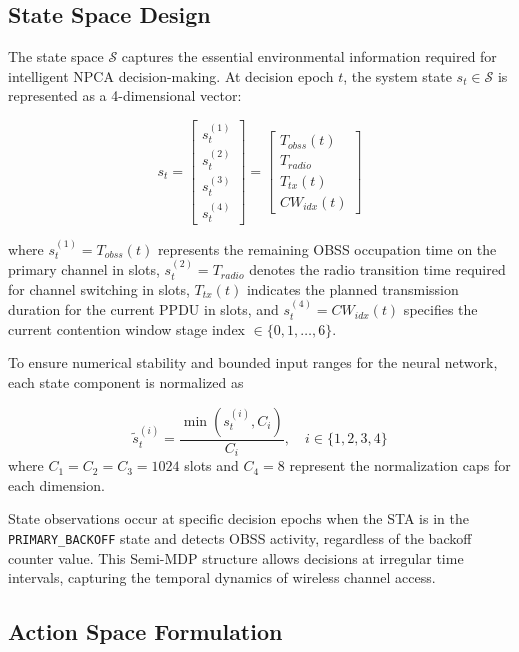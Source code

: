 \documentclass[conference]{IEEEtran}
\begin{document}
\subsection{State Space Design}

The state space $\mathcal{S}$ captures the essential environmental information required for intelligent NPCA decision-making. At decision epoch $t$, the system state $s_t \in \mathcal{S}$ is represented as a 4-dimensional vector:

\begin{equation}
s_t = \begin{bmatrix} s_t^{(1)} \\ s_t^{(2)} \\ s_t^{(3)} \\ s_t^{(4)} \end{bmatrix} = \begin{bmatrix} T_{obss}(t) \\ T_{radio} \\ T_{tx}(t) \\ CW_{idx}(t) \end{bmatrix}
\label{eq:state_vector}
\end{equation}

where $s_t^{(1)} = T_{obss}(t)$ represents the remaining OBSS occupation time on the primary channel in slots, $s_t^{(2)} = T_{radio}$ denotes the radio transition time required for channel switching in slots, $T_{tx}(t)$ indicates the planned transmission duration for the current PPDU in slots, and $s_t^{(4)} = CW_{idx}(t)$ specifies the current contention window stage index $\in \{0, 1, \ldots, 6\}$.

To ensure numerical stability and bounded input ranges for the neural network, each state component is normalized as

\begin{equation}
\tilde{s}_t^{(i)} = \frac{\min(s_t^{(i)}, C_i)}{C_i}, \quad i \in \{1,2,3,4\}
\label{eq:state_normalization}
\end{equation}
where $C_1 = C_2 = C_3 = 1024$ slots and $C_4 = 8$ represent the normalization caps for each dimension.

State observations occur at specific decision epochs when the STA is in the \texttt{PRIMARY\_BACKOFF} state and detects OBSS activity, regardless of the backoff counter value. This Semi-MDP structure allows decisions at irregular time intervals, capturing the temporal dynamics of wireless channel access.

\subsection{Action Space Formulation}
\end{document}
